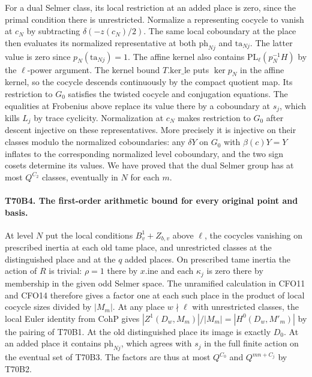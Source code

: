 For a dual Selmer class, its local restriction at an added
place is zero, since the primal condition there is unrestricted.
Normalize a representing cocycle to vanish at $c_N$ by subtracting
$\delta(-z(c_N)/2)$. The same local coboundary at the place
then evaluates its normalized representative at both
$\mathrm{ph}_{Nj}$ and $\mathrm{ta}_{Nj}$. The latter value
is zero since $p_N(\mathrm{ta}_{Nj})=1$. The affine kernel
also contains $\mathrm{PL}_\ell(p_N^{-1}H)$ by the $\ell$-power
argument. The kernel bound $T.\mathrm{ker\_le}$ puts $\ker p_N$
in the affine kernel, so the cocycle descends continuously by
the compact quotient map. Its restriction to $G_0$ satisfies
the twisted cocycle and conjugation equations. The equalities
at Frobenius above replace its value there by a coboundary at
$s_j$, which kills $L_j$ by trace cyclicity. Normalization at
$c_N$ makes restriction to $G_0$ after descent injective on
these representatives. More precisely it is injective on their
classes modulo the normalized coboundaries: any $\delta Y$ on
$G_0$ with $\beta(c)Y=Y$ inflates to the corresponding normalized
level coboundary, and the two sign cosets determine its values.
We have proved that the dual Selmer group has at most $Q^{C_2}$
classes, eventually in $N$ for each $m$.

\paragraph{T70B4. The first-order arithmetic bound for every original point and basis.}
At level $N$ put the local conditions $B_v^1+Z_{b,v}$ above
$\ell$, the cocycles vanishing on prescribed inertia at each
old tame place, and unrestricted classes at the distinguished
place and at the $q$ added places. On prescribed tame inertia
the action of $R$ is trivial: $\rho=1$ there by $x.\mathrm{ine}$
and each $\kappa_j$ is zero there by membership in the given
odd Selmer space. The unramified calculation in CFO11 and CFO14
therefore gives a factor one at each such place in the product
of local cocycle sizes divided by $|M_m|$. At any place
$w\nmid\ell$ with unrestricted classes, the local Euler
identity from $\mathrm{CohP}$ gives
$|Z^1(D_w,M_m)|/|M_m|=|H^0(D_w,M'_m)|$ by the pairing of T70B1.
At the old distinguished place its image is exactly $D_0$.
At an added place it contains $\mathrm{ph}_{Nj}$, which agrees
with $s_j$ in the full finite action on the eventual set of
T70B3. The factors are thus at most $Q^{C_0}$ and
$Q^{mn+C_j}$ by T70B2.

